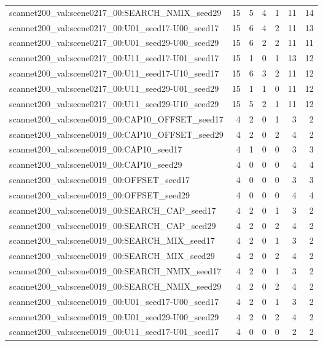 \begin{table}[t]
\begin{tabular}{lrrrrrr}
scannet200\_val:scene0217\_00:SEARCH\_NMIX\_seed29 & 15 & 5 & 4 & 1 & 11 & 14 \\
scannet200\_val:scene0217\_00:U01\_seed17-U00\_seed17 & 15 & 6 & 4 & 2 & 11 & 13 \\
scannet200\_val:scene0217\_00:U01\_seed29-U00\_seed29 & 15 & 6 & 2 & 2 & 11 & 11 \\
scannet200\_val:scene0217\_00:U11\_seed17-U01\_seed17 & 15 & 1 & 0 & 1 & 13 & 12 \\
scannet200\_val:scene0217\_00:U11\_seed17-U10\_seed17 & 15 & 6 & 3 & 2 & 11 & 12 \\
scannet200\_val:scene0217\_00:U11\_seed29-U01\_seed29 & 15 & 1 & 1 & 0 & 11 & 12 \\
scannet200\_val:scene0217\_00:U11\_seed29-U10\_seed29 & 15 & 5 & 2 & 1 & 11 & 12 \\
scannet200\_val:scene0019\_00:CAP10\_OFFSET\_seed17 & 4 & 2 & 0 & 1 & 3 & 2 \\
scannet200\_val:scene0019\_00:CAP10\_OFFSET\_seed29 & 4 & 2 & 0 & 2 & 4 & 2 \\
scannet200\_val:scene0019\_00:CAP10\_seed17 & 4 & 1 & 0 & 0 & 3 & 3 \\
scannet200\_val:scene0019\_00:CAP10\_seed29 & 4 & 0 & 0 & 0 & 4 & 4 \\
scannet200\_val:scene0019\_00:OFFSET\_seed17 & 4 & 0 & 0 & 0 & 3 & 3 \\
scannet200\_val:scene0019\_00:OFFSET\_seed29 & 4 & 0 & 0 & 0 & 4 & 4 \\
scannet200\_val:scene0019\_00:SEARCH\_CAP\_seed17 & 4 & 2 & 0 & 1 & 3 & 2 \\
scannet200\_val:scene0019\_00:SEARCH\_CAP\_seed29 & 4 & 2 & 0 & 2 & 4 & 2 \\
scannet200\_val:scene0019\_00:SEARCH\_MIX\_seed17 & 4 & 2 & 0 & 1 & 3 & 2 \\
scannet200\_val:scene0019\_00:SEARCH\_MIX\_seed29 & 4 & 2 & 0 & 2 & 4 & 2 \\
scannet200\_val:scene0019\_00:SEARCH\_NMIX\_seed17 & 4 & 2 & 0 & 1 & 3 & 2 \\
scannet200\_val:scene0019\_00:SEARCH\_NMIX\_seed29 & 4 & 2 & 0 & 2 & 4 & 2 \\
scannet200\_val:scene0019\_00:U01\_seed17-U00\_seed17 & 4 & 2 & 0 & 1 & 3 & 2 \\
scannet200\_val:scene0019\_00:U01\_seed29-U00\_seed29 & 4 & 2 & 0 & 2 & 4 & 2 \\
scannet200\_val:scene0019\_00:U11\_seed17-U01\_seed17 & 4 & 0 & 0 & 0 & 2 & 2 \\

\end{tabular}
\end{table}
